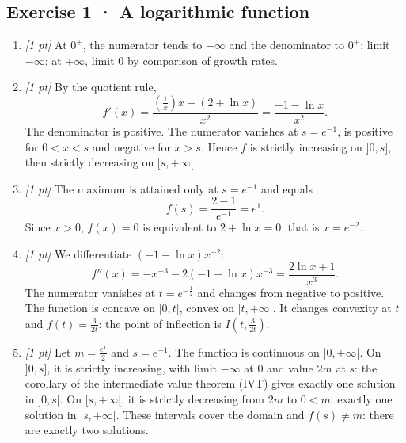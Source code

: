 \subsection*{Exercise 1 · A logarithmic function}\begin{enumerate}

\item \textit{[1 pt]} At $0^+$, the numerator tends to $-\infty$ and the denominator to $0^+$: limit $-\infty$; at $+\infty$, limit $0$ by comparison of growth rates.

\item \textit{[1 pt]} By the quotient rule,
\[f'(x)=\frac{(\frac{1}{x})x-(2+\ln x)}{x^2}=\frac{-1-\ln x}{x^2}.\]
The denominator is positive. The numerator vanishes at $s=e^{-1}$, is positive for $0<x<s$ and negative for $x>s$. Hence $f$ is strictly increasing on $]0,s]$, then strictly decreasing on $[s,+\infty[$.

\item \textit{[1 pt]} The maximum is attained only at $s=e^{-1}$ and equals
\[f(s)=\frac{2- 1}{e^{-1}}=e^{1}.\]
Since $x>0$, $f(x)=0$ is equivalent to $2+\ln x=0$, that is $x=e^{-2}$.

\item \textit{[1 pt]} We differentiate $(-1-\ln x)x^{-2}$:
\[f''(x)=-x^{-3}-2(-1-\ln x)x^{-3}=\frac{2\ln x+1}{x^3}.\]
The numerator vanishes at $t=e^{-\frac{1}{2}}$ and changes from negative to positive. The function is concave on $]0,t]$, convex on $[t,+\infty[$. It changes convexity at $t$ and $f(t)=\frac{3}{2t}$: the point of inflection is $I(t,\frac{3}{2t})$.

\item \textit{[1 pt]} Let $m=\frac{e^{1}}{2}$ and $s=e^{-1}$. The function is continuous on $]0,+\infty[$. On $]0,s]$, it is strictly increasing, with limit $-\infty$ at $0$ and value $2m$ at $s$: the corollary of the intermediate value theorem (IVT) gives exactly one solution in $]0,s[$. On $[s,+\infty[$, it is strictly decreasing from $2m$ to $0<m$: exactly one solution in $]s,+\infty[$. These intervals cover the domain and $f(s)\ne m$: there are exactly two solutions.

\end{enumerate}

